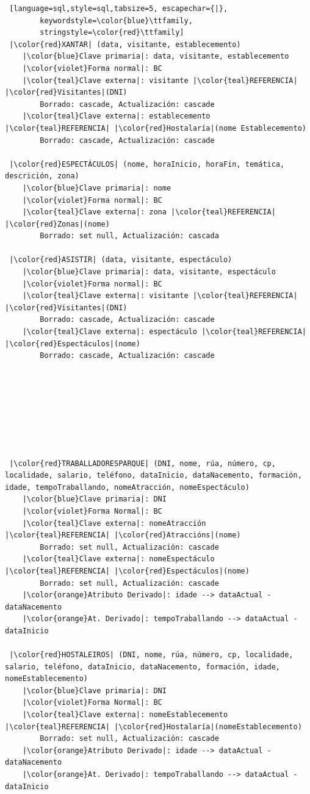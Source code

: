 \documentclass[12pt,a4paper]{book}
\theoremstyle{definition}
\theoremstyle{break}
\begin{document}
\begin{lstlisting} [language=sql,style=sql,tabsize=5, escapechar={|},
		keywordstyle=\color{blue}\ttfamily,
		stringstyle=\color{red}\ttfamily]
 |\color{red}XANTAR| (data, visitante, establecemento)
	|\color{blue}Clave primaria|: data, visitante, establecemento
	|\color{violet}Forma normal|: BC
	|\color{teal}Clave externa|: visitante |\color{teal}REFERENCIA| |\color{red}Visitantes|(DNI)
		Borrado: cascade, Actualización: cascade
	|\color{teal}Clave externa|: establecemento |\color{teal}REFERENCIA| |\color{red}Hostalaría|(nome Establecemento)
		Borrado: cascade, Actualización: cascade
		
 |\color{red}ESPECTÁCULOS| (nome, horaInicio, horaFin, temática, descrición, zona)
	|\color{blue}Clave primaria|: nome
	|\color{violet}Forma normal|: BC
	|\color{teal}Clave externa|: zona |\color{teal}REFERENCIA| |\color{red}Zonas|(nome)
		Borrado: set null, Actualización: cascada
		
 |\color{red}ASISTIR| (data, visitante, espectáculo)
	|\color{blue}Clave primaria|: data, visitante, espectáculo
	|\color{violet}Forma normal|: BC
	|\color{teal}Clave externa|: visitante |\color{teal}REFERENCIA| |\color{red}Visitantes|(DNI)
		Borrado: cascade, Actualización: cascade
	|\color{teal}Clave externa|: espectáculo |\color{teal}REFERENCIA| |\color{red}Espectáculos|(nome)
		Borrado: cascade, Actualización: cascade
		
		
		
		
		
		
		
		
 |\color{red}TRABALLADORESPARQUE| (DNI, nome, rúa, número, cp, localidade, salario, teléfono, dataInicio, dataNacemento, formación, idade, tempoTraballando, nomeAtracción, nomeEspectáculo)
	|\color{blue}Clave primaria|: DNI
	|\color{violet}Forma Normal|: BC
	|\color{teal}Clave externa|: nomeAtracción |\color{teal}REFERENCIA| |\color{red}Atraccións|(nome)
		Borrado: set null, Actualización: cascade
	|\color{teal}Clave externa|: nomeEspectáculo |\color{teal}REFERENCIA| |\color{red}Espectáculos|(nome)
		Borrado: set null, Actualización: cascade
	|\color{orange}Atributo Derivado|: idade --> dataActual - dataNacemento
	|\color{orange}At. Derivado|: tempoTraballando --> dataActual - dataInicio
		
 |\color{red}HOSTALEIROS| (DNI, nome, rúa, número, cp, localidade, salario, teléfono, dataInicio, dataNacemento, formación, idade, nomeEstablecemento)
	|\color{blue}Clave primaria|: DNI
	|\color{violet}Forma Normal|: BC
	|\color{teal}Clave externa|: nomeEstablecemento |\color{teal}REFERENCIA| |\color{red}Hostalaría|(nomeEstablecemento)
		Borrado: set null, Actualización: cascade
	|\color{orange}Atributo Derivado|: idade --> dataActual - dataNacemento
	|\color{orange}At. Derivado|: tempoTraballando --> dataActual - dataInicio
		

\end{lstlisting}
\end{document}
